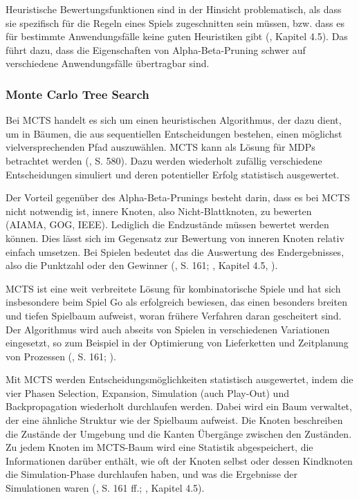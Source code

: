 Heuristische Bewertungsfunktionen sind in der Hinsicht problematisch, als dass sie spezifisch für die Regeln eines Spiels zugeschnitten sein müssen, bzw. dass es für bestimmte Anwendungsfälle keine guten Heuristiken gibt (\cite{Ferguson.January2019}, Kapitel 4.5). Das führt dazu, dass die Eigenschaften von Alpha-Beta-Pruning schwer auf verschiedene Anwendungsfälle übertragbar sind.

\subsubsection{Monte Carlo Tree Search}

Bei MCTS handelt es sich um einen heuristischen Algorithmus, der dazu dient, um in Bäumen, die aus sequentiellen Entscheidungen bestehen, einen möglichst vielversprechenden Pfad auszuwählen. MCTS kann als Lösung für MDPs betrachtet werden (\cite{Russell.2020}, S. 580). Dazu werden wiederholt zufällig verschiedene Entscheidungen simuliert und deren potentieller Erfolg statistisch ausgewertet.

Der Vorteil gegenüber des Alpha-Beta-Prunings besteht darin, dass es bei MCTS nicht notwendig ist, innere Knoten, also Nicht-Blattknoten, zu bewerten (AIAMA, GOG, IEEE). Lediglich die Endzustände müssen bewertet werden können. Dies lässt sich im Gegensatz zur Bewertung von inneren Knoten relativ einfach umsetzen. Bei Spielen bedeutet das die Auswertung des Endergebnisses, also die Punktzahl oder den Gewinner (\cite{Russell.2020}, S. 161; \cite{Ferguson.January2019}, Kapitel 4.5, \cite{Browne.2012}).

MCTS ist eine weit verbreitete Lösung für kombinatorische Spiele und hat sich insbesondere beim Spiel Go als erfolgreich bewiesen, das einen besonders breiten und tiefen Spielbaum aufweist, woran frühere Verfahren daran gescheitert sind. Der Algorithmus wird auch abseits von Spielen in verschiedenen Variationen eingesetzt, so zum Beispiel in der Optimierung von Lieferketten und Zeitplanung von Prozessen (\cite{Russell.2020}, S. 161; \cite{Browne.2012}).


Mit MCTS werden Entscheidungsmöglichkeiten statistisch ausgewertet, indem die vier Phasen Selection, Expansion, Simulation (auch Play-Out) und Backpropagation wiederholt durchlaufen werden. Dabei wird ein Baum verwaltet, der eine ähnliche Struktur wie der Spielbaum aufweist. Die Knoten beschreiben die Zustände der Umgebung und die Kanten Übergänge zwischen den Zuständen. Zu jedem Knoten im MCTS-Baum wird eine Statistik abgespeichert, die Informationen darüber enthält, wie oft der Knoten selbst oder dessen Kindknoten die Simulation-Phase durchlaufen haben, und was die Ergebnisse der Simulationen waren (\cite{Russell.2020}, S. 161 ff.; \cite{Ferguson.January2019}, Kapitel 4.5).

